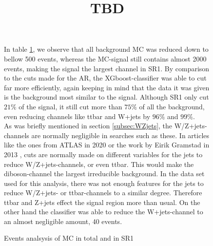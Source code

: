 \documentclass{article}
\begin{document}
\begin{figure}
\bgroup
In table \ref{table:SR1_R}, we observe that all background MC was reduced down to bellow 500 events, whereas the MC-signal still contains almost 2000 events, making the signal the largest channel in SR1. By comparison to the cuts made for the AR, the XGboost-classifier was able to cut far more efficiently, again keeping in mind that the data it was given is the background most similar to the signal. Although SR1 only cut $21\%$ of the signal, it still cut more than $75\%$ of all the background, even reducing channels like ttbar and W+jets by $96\%$ and $99\%$.
\\
As was briefly mentioned in section \ref{subsec:WZjets}, the W/Z+jets-channels are normally negligible in searches such as these.  In articles like the ones from ATLAS in 2020 \cite{Aad_2020} or the work by Eirik Gramstad in 2013 \cite{Gramstad:2013loc}, cuts are normally made on different variables for the jets to reduce W/Z+jets-channels, or even ttbar. This would make the diboson-channel the largest irreducible background. In the data set used for this analysis, there was not enough features for the jets to reduce W/Z+jets- or ttbar-channels to a similar degree. Therefore ttbar and Z+jets effect the signal region more than usual. On the other hand the classifier was able to reduce the W+jets-channel to an almost negligible amount, 40 events.
\title{TBD}
{\tabcolsep=20pt
\begin{table}
    \caption{Events analsysis of MC in total and in SR1}
    \centering 
    \begin{threeparttable}
    \end{threeparttable}
    \label{table:SR1_R}
\end{table}
}
\egroup
\end{figure}
\end{document}
